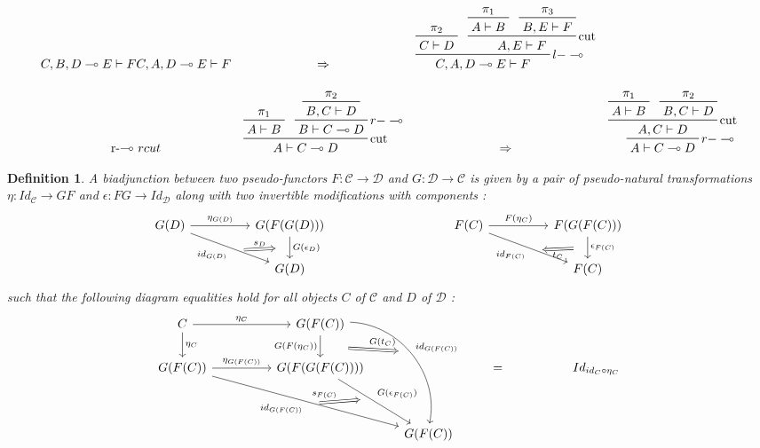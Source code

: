 \documentclass[a4paper, 12pt, twoside,openright]{report}
\newtheorem{definition}{Definition}
\begin{document}
$$\begin{array}{cccc}
{		{C,B,D\multimap E \vdash  F}
	}
	{C,A, D \multimap E \vdash F}
&
\Rightarrow
&
\prftree[r]{$l-\multimap$}
	{\prftree{\pi_2}{C \vdash D}}
	{\prftree[r]{cut}
		{\prftree{\pi_1}{A\vdash B}}
		{\prftree{\pi_3}{B,E \vdash F}}
		{A,E \vdash F}
	}
{C,A, D \multimap E \vdash F}
\\
\\
\text{r-$\multimap$ } rcut
&
\prftree[r]{cut}
	{\prftree{\pi_1}{A\vdash B}}
	{
	\prftree[r]{$r-\multimap$}
		{\prftree{\pi_2}{B,C \vdash D}}
		{B \vdash  C\multimap D}
	}
	{A \vdash C\multimap D}
&
\Rightarrow
&
\prftree[r]{$r-\multimap$}
	{\prftree[r]{cut}
		{\prftree{\pi_1}{A\vdash B}}
		{\prftree{\pi_2}{B,C \vdash D}}
		{A,C \vdash D}
	}
{A \vdash C\multimap D}
\end{array}%
$$

\begin{definition}
A biadjunction between two pseudo-functors $F:\mathcal{C} \rightarrow \mathcal{D}$ and $G:\mathcal{D} \rightarrow \mathcal{C}$ is given by a pair of pseudo-natural transformations $\eta: Id_{\mathcal{C}} \rightarrow G F$ and $\epsilon : F G \rightarrow Id_{\mathcal{D}}$ along with two invertible modifications with components :
$$
\begin{tikzcd}
G(D)
\arrow{rr}{\eta_{G(D)}}
\arrow[swap]{rrd}{id_{G(D)}}[name=A]{}
&&
G(F(G(D)))
\arrow{d}{G(\epsilon_D)}[name=B]{}
&&&&
F(C)
\arrow{rr}{F(\eta_C)}
\arrow[swap]{rrd}{id_{F(C)}}[name=C]{}
&&
F(G(F(C)))
\arrow{d}{\epsilon_{F(C)}}[name=D]{}
\\
&&
G(D)
&&&&&&
F(C)
\arrow[Rightarrow,shorten >=0.4cm, shorten <=0.4cm,from=A,to=B]{}{s_D}
\arrow[Rightarrow,shorten >=0.4cm, shorten <=0.4cm,from=D,to=C]{}{t_C}
\end{tikzcd}
$$
such that the following diagram equalities hold for all objects $C$ of $\mathcal{C}$ and $D$ of $\mathcal{D}$ :
$$
\begin{tikzcd}
C
\arrow{rr}{\eta_C}
\arrow{d}{\eta_C}
&&
G(F(C))
\arrow[swap]{d}{G(F(\eta_C))}[name=B]{}
\arrow[bend left=50]{rddd}{id_{G(F(C))}}[name=C]{}
\\
G(F(C))
\arrow{rr}{\eta_{G(F(C))}}
\arrow[swap]{rrrdd}{id_{G(F(C))}}[name=A]{}
&&
G(F(G(F(C))))
\arrow{rdd}{G(\epsilon_{F(C)})}[name=D]{}
&&
=
&&
 Id_{id_C \circ \eta_C}
\\
\\
&&
&
G(F(C))
\arrow[Rightarrow,shorten >=0.4cm, shorten <=0.4cm,from=A,to=D]{}{s_{F(C)}}
\arrow[Rightarrow,shorten >=0.4cm, shorten <=0.8cm,from=B,to=C]{}{G(t_C)}
\end{tikzcd}
$$
$$
$$
\end{definition}
\end{document}
